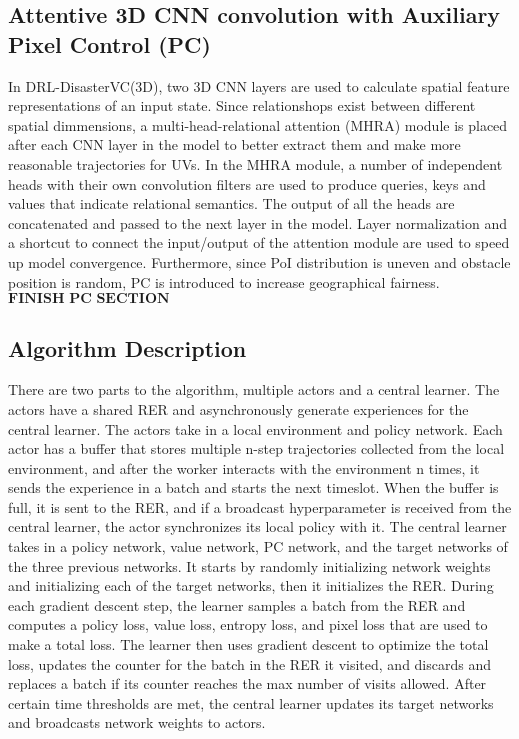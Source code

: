 \documentclass[sigconf, natbib=false]{acmart}
\begin{document}
   \subsection{Attentive 3D CNN convolution with Auxiliary Pixel Control (PC)}
   In DRL-DisasterVC(3D), two 3D CNN layers are used to calculate spatial feature representations of an input state. Since relationshops exist between different spatial dimmensions, a multi-head-relational attention (MHRA) module is placed after each CNN layer in the model to better extract them and make more reasonable trajectories for UVs. In the MHRA module, a number of independent heads with their own convolution filters are used to produce queries, keys and values that indicate relational semantics. The output of all the heads are concatenated and passed to the next layer in the model. Layer normalization and a shortcut to connect the input/output of the attention module are used to speed up model convergence. Furthermore, since PoI distribution is uneven and obstacle position is random, PC is introduced to increase geographical fairness. $\textbf{FINISH PC SECTION}$
   
   \subsection{Algorithm Description}
   There are two parts to the algorithm, multiple actors and a central learner. The actors have a shared RER and asynchronously generate experiences for the central learner. The actors take in a local environment and policy network. Each actor has a buffer that stores multiple n-step trajectories collected from the local environment, and after the worker interacts with the environment n times, it sends the experience in a batch and starts the next timeslot. When the buffer is full, it is sent to the RER, and if a broadcast hyperparameter is received from the central learner, the actor synchronizes its local policy with it. The central learner takes in a policy network, value network, PC network, and the target networks of the three previous networks. It starts by randomly initializing network weights and initializing each of the target networks, then it initializes the RER. During each gradient descent step, the learner samples a batch from the RER and computes a policy loss, value loss, entropy loss, and pixel loss that are used to make a total loss. The learner then uses gradient descent to optimize the total loss, updates the counter for the batch in the RER it visited, and discards and replaces a batch if its counter reaches the max number of visits allowed. After certain time thresholds are met, the central learner updates its target networks and broadcasts network weights to actors.
\end{document}
